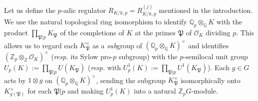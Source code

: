 \documentclass[12pt]{article}
\newcounter{rem}[section]%
\newcommand{\bbQ}{\ensuremath{\mathbb{Q}}}
\newcommand{\bbZ}{\ensuremath{\mathbb{Z}}}
\newcommand{\bbZp}{\ensuremath{\mathbb{Z}_p}}
\newcommand{\cO}{\ensuremath{\mathcal{O}}}
\newcommand{\fP}{\ensuremath{\mathfrak{P}}}
\newcommand{\rem}{\refstepcounter{rem}\noindent{\sc Remark \therem}}%
\renewcommand{\therem}{\thesection.\arabic{rem}}
\begin{document}
Let us define the $p$-adic regulator $R_{K/k,p}=R^{(j)}_{K/k,p}$ mentioned in the
introduction. We use the natural topological ring isomorphism to identify
$\bbQ_p\otimes_\bbQ K$ with the product
$\prod_{\fP|p}K_\fP$ of the completions of $K$ at the primes $\fP$ of $\cO_K$ dividing $p$.
This allows us to regard each $K_\fP^\times$ as a \emph{sub}group
of $(\bbQ_p\otimes_\bbQ K)^\times$ and identifies
$(\bbZ_p\otimes_\bbZ\cO_K)^\times$ (\emph{resp.} its Sylow pro-$p$ subgroup) with
the $p$-semilocal unit group $U_p(K):=\prod_{\fP|p}U(K_\fP)$
(\emph{resp.} with $U^1_p(K):=\prod_{\fP|p}U^{1}(K_\fP)$).
Each $g\in G$ acts by $1\otimes g$ on
$(\bbQ_p\otimes_\bbQ K)^\times$,
sending the subgroup $K_\fP^\times$ isomorphically onto $K_{g(\fP)}^\times$ for each
$\fP|p$ and making $U^1_p(K)$ into a natural $\bbZp G$-module.
\end{document}
